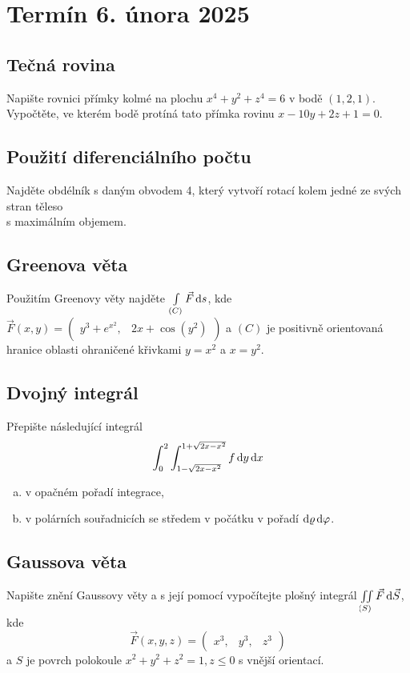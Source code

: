 \section{Termín 6. února 2025}

\subsection{Tečná rovina}
Napište rovnici přímky kolmé na plochu $x^4 + y^2 + z^4 = 6$ v bodě $(1,2,1)$. Vypočtěte, ve kterém bodě protíná tato 
přímka rovinu $x-10y + 2z + 1 = 0$.

\subsection{Použití diferenciálního počtu}
Najděte obdélník s daným obvodem 4, který vytvoří rotací kolem jedné ze svých stran těleso \\
s maximálním objemem.

\subsection{Greenova věta}
Použitím Greenovy věty najděte $\int\limits_{(C)} \vec{F} \mathop{}\!\mathrm{d} s$, kde $\vec{F}(x,y) = 
\begin{pmatrix}
    y^3 + e^{x^2}, & 2x + \cos(y^2)
\end{pmatrix}$ a $(C)$ je positivně orientovaná hranice oblasti ohraničené křivkami $y=x^2$ a $x=y^2$.

\subsection{Dvojný integrál}
Přepište následující integrál
\[
\int_{0}^{2} \int_{1-\sqrt{2x - x^2}}^{1+\sqrt{2x - x^2}} f \mathop{}\!\mathrm{d} y \mathop{}\!\mathrm{d} x
\]
\begin{enumerate}[a), noitemsep]
    \item v opačném pořadí integrace,
    \item v polárních souřadnicích se středem v počátku v pořadí $\mathop{}\!\mathrm{d} \varrho \mathop{}\!\mathrm{d} \varphi$.
\end{enumerate}

\subsection{Gaussova věta}
Napište znění Gaussovy věty a s její pomocí vypočítejte plošný integrál $\iint\limits_{(S)} \vec{F} \mathop{}\!\mathrm{d} \vec{S}$, kde
\[
    \vec{F}(x,y,z) = 
    \begin{pmatrix}
        x^3, & y^3, & z^3
    \end{pmatrix}
\]
a $S$ je povrch polokoule $x^2 + y^2 + z^2 = 1, z \leq 0$ s vnější orientací.